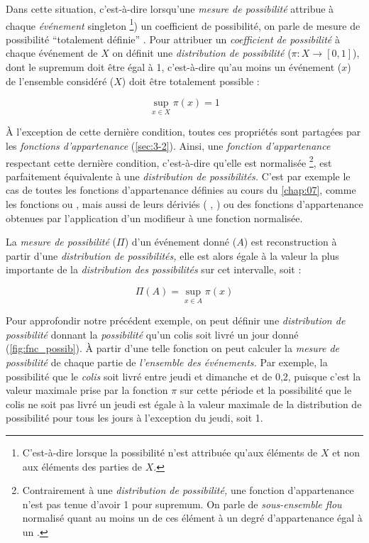 Dans cette situation, c'est-à-dire lorsqu'une \emph{mesure de
  possibilité} attribue à chaque \emph{événement} singleton
\footnote{C'est-à-dire lorsque la possibilité n'est attribuée qu'aux
  éléments de \(X\) et non aux éléments des parties de \(X\).}) un
coefficient de possibilité, on parle de mesure de possibilité
\enquote{totalement définie} \autocite{Bouchon-Meunier2007}. Pour
attribuer un \emph{coefficient de possibilité} à chaque événement de
\(X\) on définit une \emph{distribution de possibilité}
(\(π : X → [0,1]\)), dont le supremum doit être égal à 1, c'est-à-dire
qu'au moins un événement (\(x\)) de l'ensemble considéré (\(X\)) doit
être totalement possible :

\begin{equation}
  \sup_{x ∈ X}π(x)=1
\end{equation}

À l'exception de cette dernière condition, toutes ces propriétés sont
partagées par les \emph{fonctions d'appartenance}
(\autoref{sec:3-2}). Ainsi, une \emph{fonction d'appartenance}
respectant cette dernière condition, c'est-à-dire qu'elle est
normalisée \footnote{Contrairement à une \emph{distribution de
    possibilité,} une fonction d'appartenance n'est pas tenue d'avoir
  1 pour supremum. On parle de \emph{sous-ensemble flou} normalisé
  quant au moins un de ces élément à un degré d’appartenance égal à un
  \autocite{Bouchon-Meunier2007}.}, est parfaitement équivalente à une
\emph{distribution de possibilités.} C'est par exemple le cas de
toutes les fonctions d'appartenance définies au cours du
\autoref{chap:07}, comme les fonctions  ou
, mais aussi de leurs dériviés (\eg
{}, ) ou des fonctions
d'appartenance obtenues par l’application d'un modifieur à une
fonction normalisée.

La \emph{mesure de possibilité} (\(\Pi\)) d'un événement donné (\(A\))
est reconstruction à partir d'une \emph{distribution de possibilités,}
elle est alors égale à la valeur la plus importante de la
\emph{distribution des possibilités} sur cet intervalle, soit :

\begin{equation}
  \Pi(A) = \sup_{x \in A}\pi(x)
\end{equation}

Pour approfondir notre précédent exemple, on peut définir une
\emph{distribution de possibilité} donnant la \emph{possibilité} qu'un
colis soit livré un jour donné (\autoref{fig:fnc_possib}). À partir
d'une telle fonction on peut calculer la \emph{mesure de possibilité}
de chaque partie de \emph{l'ensemble des événements.} Par exemple, la
possibilité que le \emph{colis} soit livré entre jeudi et dimanche et
de 0,2, puisque c'est la valeur maximale prise par la fonction \(\pi\)
sur cette période et la possibilité que le colis ne soit pas livré un
jeudi est égale à la valeur maximale de la distribution de possibilité
pour tous les jours à l'exception du jeudi, soit 1.

